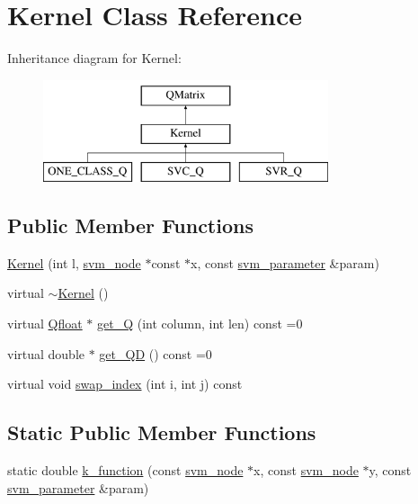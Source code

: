 \hypertarget{classKernel}{}\section{Kernel Class Reference}
\label{classKernel}
Inheritance diagram for Kernel\+:\begin{figure}[H]
\begin{center}
\leavevmode
\includegraphics[height=3.000000cm]{classKernel}
\end{center}
\end{figure}
\subsection*{Public Member Functions}
\begin{DoxyCompactItemize}
\item 
\hyperlink{classKernel_a25ffaa0c67cc5b8c7fcdb6f97ca1725f}{Kernel} (int l, \hyperlink{structsvm__node}{svm\+\_\+node} $\ast$const $\ast$x, const \hyperlink{structsvm__parameter}{svm\+\_\+parameter} \&param)
\item 
virtual \hyperlink{classKernel_a9c7407e3a0b1cb9b2f96e9a030187064}{$\sim$\+Kernel} ()
\item 
virtual \hyperlink{svm__core_8cpp_a8755d90a54ecfb8d15051af3e0542592}{Qfloat} $\ast$ \hyperlink{classKernel_a02f328649424359b92b941f5219a6060}{get\+\_\+Q} (int column, int len) const  =0
\item 
virtual double $\ast$ \hyperlink{classKernel_a7bf9602583da1af48d15d19da69514ac}{get\+\_\+\+QD} () const  =0
\item 
virtual void \hyperlink{classKernel_adca807c5584bc42fd098cd9eb1f19621}{swap\+\_\+index} (int i, int j) const 
\end{DoxyCompactItemize}
\subsection*{Static Public Member Functions}
\begin{DoxyCompactItemize}
\item 
static double \hyperlink{classKernel_a6ff0d4ac64bf7fba29d2ca3433dd5127}{k\+\_\+function} (const \hyperlink{structsvm__node}{svm\+\_\+node} $\ast$x, const \hyperlink{structsvm__node}{svm\+\_\+node} $\ast$y, const \hyperlink{structsvm__parameter}{svm\+\_\+parameter} \&param)
\end{DoxyCompactItemize}
